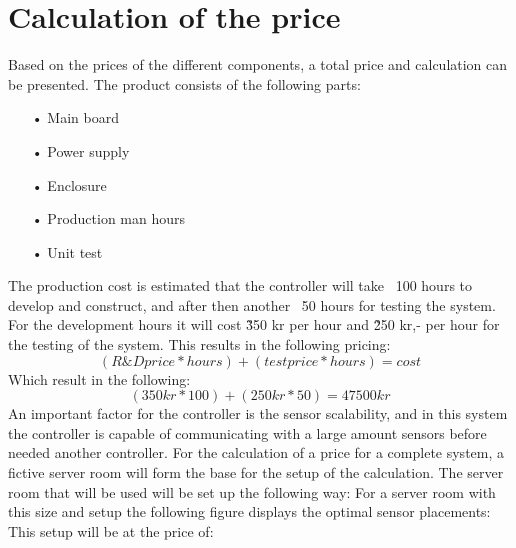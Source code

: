 \section{Calculation of the price}
Based on the prices of the different components, a total price and calculation can be presented.\newline
The product consists of the following parts:
\begin{enumerate}
	\item[•]Main board
	\item[•]Power supply
	\item[•]Enclosure
	\item[•]Production man hours
	\item[•]Unit test
\end{enumerate}
The production cost is estimated that the controller will take ~100 hours to develop and construct, and after then another ~50 hours for testing the system.\newline
For the development hours it will cost \~350 kr per hour and \~250 kr,- per hour for the testing of the system. This results in the following pricing:
$$(R\&Dprice*hours)+(testprice*hours)=cost$$
Which result in the following:
$$(350 kr*100)+(250 kr*50)=47500kr$$
An important factor for the controller is the sensor scalability, and in this system the controller is capable of communicating with a large amount sensors before needed another controller.\newline
For the calculation of a price for a complete system, a fictive server room will form the base for the setup of the calculation.
The server room that will be used will be set up the following way:
\newline
\newpage
For a server room with this size and setup the following figure displays the optimal sensor placements:\newline
{}
\newline
This setup will be at the price of:\newline

